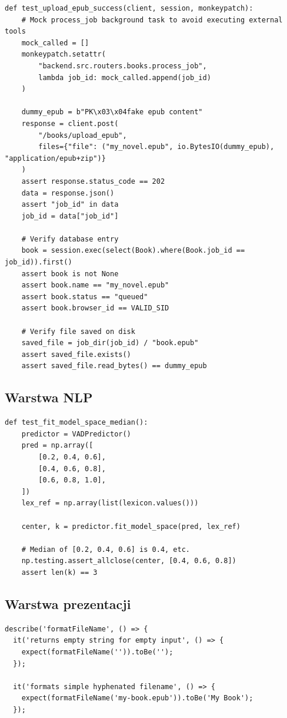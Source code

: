 \begin{lstlisting}[style=pythonStyle, label={lst:backend_integ}, caption={
    Przykład testów integracyjnych w backendzie.
}]
def test_upload_epub_success(client, session, monkeypatch):
    # Mock process_job background task to avoid executing external tools
    mock_called = []
    monkeypatch.setattr(
        "backend.src.routers.books.process_job",
        lambda job_id: mock_called.append(job_id)
    )

    dummy_epub = b"PK\x03\x04fake epub content"
    response = client.post(
        "/books/upload_epub",
        files={"file": ("my_novel.epub", io.BytesIO(dummy_epub), "application/epub+zip")}
    )
    assert response.status_code == 202
    data = response.json()
    assert "job_id" in data
    job_id = data["job_id"]

    # Verify database entry
    book = session.exec(select(Book).where(Book.job_id == job_id)).first()
    assert book is not None
    assert book.name == "my_novel.epub"
    assert book.status == "queued"
    assert book.browser_id == VALID_SID

    # Verify file saved on disk
    saved_file = job_dir(job_id) / "book.epub"
    assert saved_file.exists()
    assert saved_file.read_bytes() == dummy_epub
\end{lstlisting}

\subsection{Warstwa NLP}
\begin{lstlisting}[style=pythonStyle, label={lst:nlp_unit}, caption={
    Przykład testów jednostkowych w kontenerze NLP.
}]
def test_fit_model_space_median():
    predictor = VADPredictor()
    pred = np.array([
        [0.2, 0.4, 0.6],
        [0.4, 0.6, 0.8],
        [0.6, 0.8, 1.0],
    ])
    lex_ref = np.array(list(lexicon.values()))

    center, k = predictor.fit_model_space(pred, lex_ref)

    # Median of [0.2, 0.4, 0.6] is 0.4, etc.
    np.testing.assert_allclose(center, [0.4, 0.6, 0.8])
    assert len(k) == 3
\end{lstlisting}

\subsection{Warstwa prezentacji}
\begin{lstlisting}[style=pythonStyle, label={lst:frontend_unit}, caption={
    Przykład testów jednostkowych w warstwie prezentacji.
}]
describe('formatFileName', () => {
  it('returns empty string for empty input', () => {
    expect(formatFileName('')).toBe('');
  });

  it('formats simple hyphenated filename', () => {
    expect(formatFileName('my-book.epub')).toBe('My Book');
  });
\end{lstlisting}


